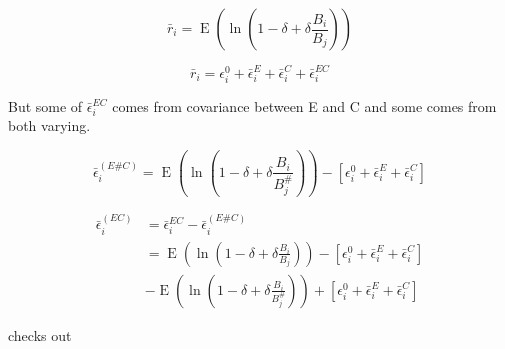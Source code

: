 \documentclass[letterpaper,11pt]{article}
\DeclareMathOperator{\EX}{E}%
\begin{document}
\begin{equation}
\bar r_i=\EX(\ln(1-\delta + \delta \frac{B_i}{B_j}))\label{rbari}
\end{equation}

\begin{equation}
\bar r_i=\epsilon_i^0 +\bar \epsilon_i^E + \bar \epsilon_i^C + \bar \epsilon_i^{EC} \label{rbari_decomp}
\end{equation}

But some of $\bar \epsilon_i^{EC}$ comes from covariance between E and C and some comes from both varying.

\begin{equation}
\bar \epsilon_i^{(E\#C)}=\EX(\ln(1-\delta + \delta \frac{B_i}{B_j^{\#}})) -[\epsilon_i^0 +\bar \epsilon_i^E + \bar \epsilon_i^C] \label{ECvar_sharp}
\end{equation}

\begin{align}
\bar \epsilon_i^{(EC)}&=\bar \epsilon_i^{EC}-\bar \epsilon_i^{(E\#C)}\\
&= \EX(\ln(1-\delta + \delta \frac{B_i}{B_j}))-[\epsilon_i^0 +\bar \epsilon_i^E + \bar \epsilon_i^C]\\
&- \EX(\ln(1-\delta + \delta \frac{B_i}{B_j^{\#}})) +[\epsilon_i^0 +\bar \epsilon_i^E + \bar \epsilon_i^C]
\label{r_iSE}
\end{align}

checks out
\end{document}
